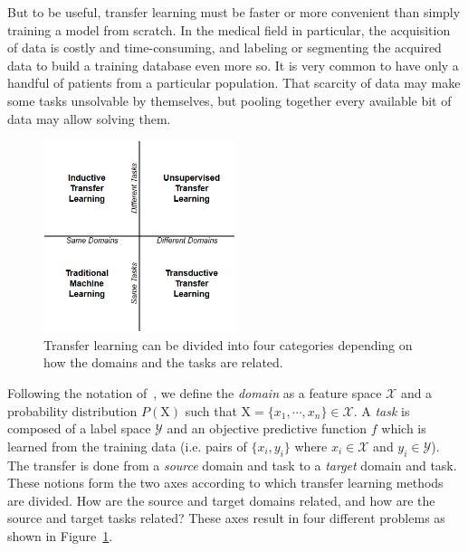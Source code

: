 But to be useful, transfer learning must be faster or more convenient than simply training a model from scratch. In the medical field in particular, the acquisition of data is costly and time-consuming, and labeling or segmenting the acquired data to build a training database even more so. It is very common to have only a handful of patients from a particular population. That scarcity of data may make some tasks unsolvable by themselves, but pooling together every available bit of data may allow solving them. 

\begin{figure}[htb]
    \centering
	\includegraphics[width=0.5\textwidth]{img_transfer/transfer_types.png}
    \caption{Transfer learning can be divided into four categories depending on how the domains and the tasks are related.}
    \label{fig:transfer_types}
\end{figure}

Following the notation of~\textcite{pan2010TNDE}, we define the \textit{domain} as a feature space $\mathcal{X}$ and a probability distribution $P\left( \mathrm{X} \right)$ such that $\mathrm{X} = \{ x_1, \cdots, x_n \} \in \mathcal{X}$. A \textit{task} is composed of a label space $\mathcal{Y}$ and an objective predictive function $f$ which is learned from the training data (i.e. pairs of $\{ x_i, y_i \}$ where $x_i \in \mathcal{X}$ and $y_i \in \mathcal{Y}$). The transfer is done from a \textit{source} domain and task to a \textit{target} domain and task. These notions form the two axes according to which transfer learning methods are divided. How are the source and target domains related, and how are the source and target tasks related? These axes result in four different problems as shown in Figure~\ref{fig:transfer_types}. 

